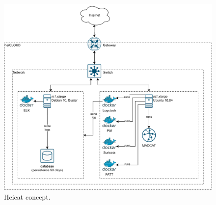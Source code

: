 \begin{figure}[ht]
    \centering
    \includegraphics[width=\textwidth]{figures/heicat-conecpt.pdf}
    \caption[Heicat concept]{Heicat concept.}
    \label{fig:heicat-concept}
\end{figure}







